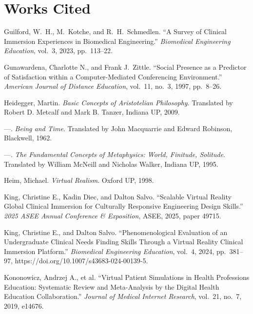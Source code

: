\documentclass{article}
\newenvironment{workscited}
  {\section*{Works Cited}\begin{list}{}
    {\setlength{\itemindent}{-0.5in}\setlength{\leftmargin}{0.5in}
     \setlength{\itemsep}{0pt}\setlength{\parsep}{6pt}}}
  {\end{list}}
\begin{document}
\begin{workscited}
\item Guilford, W.\ H., M.\ Kotche, and R.\ H.\ Schmedlen. ``A Survey of
Clinical Immersion Experiences in Biomedical Engineering.''
\textit{Biomedical Engineering Education}, vol.~3, 2023, pp.~113--22.

\item Gunawardena, Charlotte N., and Frank J.\ Zittle. ``Social Presence
as a Predictor of Satisfaction within a Computer-Mediated Conferencing
Environment.'' \textit{American Journal of Distance Education}, vol.~11,
no.~3, 1997, pp.~8--26. %

\item Heidegger, Martin. \textit{Basic Concepts of Aristotelian Philosophy}.
Translated by Robert D. Metcalf and Mark B. Tanzer, Indiana UP, 2009.

\item ---. \textit{Being and Time}. Translated by John Macquarrie and Edward
Robinson, Blackwell, 1962.

\item ---. \textit{The Fundamental Concepts of Metaphysics:
World, Finitude, Solitude}. Translated by William McNeill and Nicholas
Walker, Indiana UP, 1995. %

\item Heim, Michael. \textit{Virtual Realism}. Oxford UP, 1998.

\item King, Christine E., Kadin Diec, and Dalton Salvo. ``Scalable
Virtual Reality Global Clinical Immersion for Culturally Responsive
Engineering Design Skills.'' \textit{2025 ASEE Annual Conference \&
Exposition}, ASEE, 2025, paper 49715.

\item King, Christine E., and Dalton Salvo. ``Phenomenological Evaluation
of an Undergraduate Clinical Needs Finding Skills Through a Virtual
Reality Clinical Immersion Platform.'' \textit{Biomedical Engineering
Education}, vol.~4, 2024, pp.~381--97,
https://doi.org/10.1007/s43683-024-00139-5. %

\item Kononowicz, Andrzej A., et al. ``Virtual Patient Simulations in
Health Professions Education: Systematic Review and Meta-Analysis by the
Digital Health Education Collaboration.'' \textit{Journal of Medical
Internet Research}, vol.~21, no.~7, 2019, e14676. %


\end{workscited}
\end{document}
